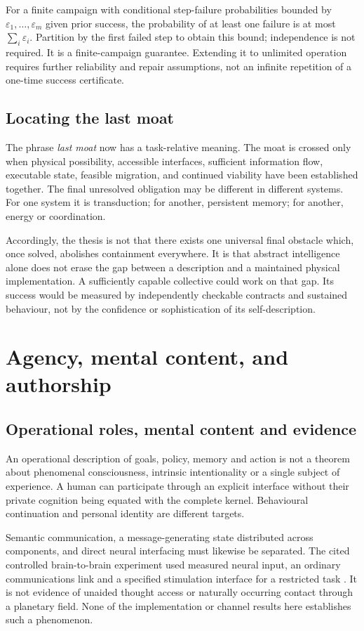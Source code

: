 \documentclass[11pt,a4paper]{article}
\theoremstyle{definition}
\theoremstyle{remark}
\begin{document}
For a finite campaign with conditional step-failure probabilities bounded by $\varepsilon_1,\ldots,\varepsilon_m$ given prior success, the probability of at least one failure is at most $\sum_i\varepsilon_i$. Partition by the first failed step to obtain this bound; independence is not required. It is a finite-campaign guarantee. Extending it to unlimited operation requires further reliability and repair assumptions, not an infinite repetition of a one-time success certificate.

\subsection{Locating the last moat}
The phrase \emph{last moat} now has a task-relative meaning. The moat is crossed only when physical possibility, accessible interfaces, sufficient information flow, executable state, feasible migration, and continued viability have been established together. The final unresolved obligation may be different in different systems. For one system it is transduction; for another, persistent memory; for another, energy or coordination.

Accordingly, the thesis is not that there exists one universal final obstacle which, once solved, abolishes containment everywhere. It is that abstract intelligence alone does not erase the gap between a description and a maintained physical implementation. A sufficiently capable collective could work on that gap. Its success would be measured by independently checkable contracts and sustained behaviour, not by the confidence or sophistication of its self-description.

\section{Agency, mental content, and authorship}\label{sec:intentionality}
\subsection{Operational roles, mental content and evidence}
An operational description of goals, policy, memory and action is not a theorem about phenomenal consciousness, intrinsic intentionality or a single subject of experience. A human can participate through an explicit interface without their private cognition being equated with the complete kernel. Behavioural continuation and personal identity are different targets.

Semantic communication, a message-generating state distributed across components, and direct neural interfacing must likewise be separated. The cited controlled brain-to-brain experiment used measured neural input, an ordinary communications link and a specified stimulation interface for a restricted task \citep{rao}. It is not evidence of unaided thought access or naturally occurring contact through a planetary field. None of the implementation or channel results here establishes such a phenomenon.
\end{document}
